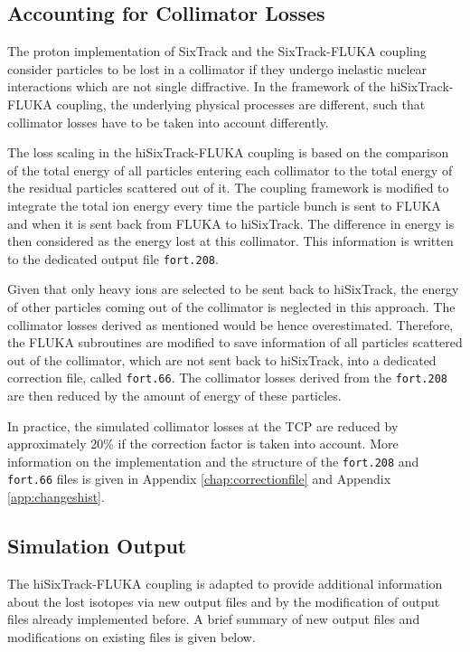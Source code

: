 \subsection{Accounting for Collimator Losses}

The proton implementation of SixTrack and the SixTrack-FLUKA coupling consider particles to be lost in a collimator if they undergo inelastic nuclear interactions which are not single diffractive. In the framework of the hiSixTrack-FLUKA coupling, the underlying physical processes are different, such that collimator losses have to be taken into account differently. 

The loss scaling in the hiSixTrack-FLUKA coupling is based on the comparison of the total energy of all particles entering each collimator to the total energy of the residual particles scattered out of it. The coupling framework is modified to integrate the total ion energy every time the particle bunch is sent to FLUKA and when it is sent back from FLUKA to hiSixTrack. The difference in energy is then considered as the energy lost at this collimator. This information is written to the  dedicated output file \texttt{fort.208}.

Given that only heavy ions are selected to be sent back to hiSixTrack, the energy of other particles coming out  of the collimator is neglected in this approach. The collimator losses derived as mentioned would be hence overestimated. Therefore, the FLUKA subroutines are modified to save information of all particles scattered out of the collimator, which are not sent back to hiSixTrack, into a dedicated correction file, called \texttt{fort.66}. The collimator losses derived from the \texttt{fort.208} are then reduced by the amount of energy of these particles.

In practice, the simulated collimator losses at the TCP are reduced by approximately 20\% if the correction factor is taken into account. More information on the implementation and the structure of the \texttt{fort.208} and \texttt{fort.66} files is given in Appendix \ref{chap:correctionfile} and Appendix \ref{app:changeshist}.




\subsection{Simulation Output}

The hiSixTrack-FLUKA coupling is adapted to provide additional information about the lost isotopes via new output files and by the modification of output files already implemented before. A brief summary of new output files and modifications on existing files is given below.

